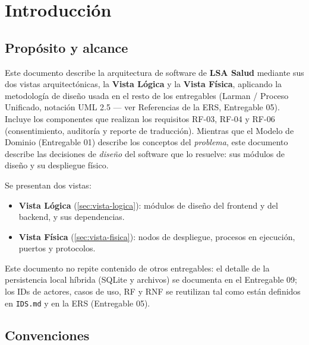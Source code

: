\section{Introducción}

\subsection{Propósito y alcance}

Este documento describe la arquitectura de software de \textbf{LSA Salud}
mediante sus dos vistas arquitectónicas, la \textbf{Vista Lógica} y la
\textbf{Vista Física}, aplicando la
metodología de diseño usada en el resto de los entregables (Larman / Proceso
Unificado, notación UML 2.5 --- ver Referencias de la ERS, Entregable 05).
Incluye los componentes que realizan los requisitos RF-03, RF-04 y
RF-06 (consentimiento, auditoría y reporte de traducción). Mientras que el Modelo de Dominio (Entregable 01) describe los conceptos del
\emph{problema}, este documento describe las decisiones de \emph{diseño} del
software que lo resuelve: sus módulos de diseño y su despliegue físico.

Se presentan dos vistas:
\begin{itemize}
    \item \textbf{Vista Lógica} (\ref{sec:vista-logica}): módulos de diseño
    del frontend y del backend, y sus dependencias.
    \item \textbf{Vista Física} (\ref{sec:vista-fisica}): nodos de despliegue,
    procesos en ejecución, puertos y protocolos.
\end{itemize}

Este documento no repite contenido de otros entregables: el detalle de la
persistencia local híbrida (SQLite y archivos) se documenta en el Entregable 09; los IDs de
actores, casos de uso, RF y RNF se reutilizan tal como están definidos en
\texttt{IDS.md} y en la ERS (Entregable 05).

\subsection{Convenciones}

